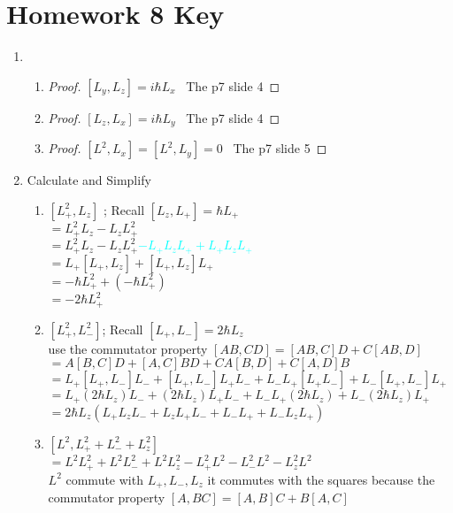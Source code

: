 \documentclass{article}
\begin{document}
\section*{Homework 8 Key}
 
\begin{enumerate}%
\item 
    \begin{enumerate}
    \item \begin{proof} $[L_y,L_z]=i\hbar L_x$
    \ The p7 slide 4
    \end{proof}
    \item \begin{proof} $[L_z,L_x]=i\hbar L_y$
    \ The p7 slide 4
    \end{proof}
    \item \begin{proof} $[L^2,L_x]=[L^2,L_y]=0$
    \ The p7 slide 5
    \end{proof}
    \end{enumerate}
\item Calculate and Simplify
    \begin{enumerate}
        \item $[L_+^2,L_z]$ ; Recall $[L_z,L_+]=\hbar L_+$
        \\ $= L_+^2L_z-L_zL_+^2$
        \\ $= L_+^2L_z-L_zL_+^2$\textcolor{cyan}{$-L_+L_zL_++L_+L_zL_+$}
        \\ $= L_+[L_+,L_z] + [L_+,L_z]L_+$
        \\ $= -\hbar L_+^2+(-\hbar L_+^2)$
        \\ $=-2\hbar L_+^2$
        \item $[L_+^2,L_-^2]$; Recall $[L_+,L_-]=2\hbar L_z$
        \\ use the commutator property $[AB,CD]=[AB,C]D+C[AB,D]$
        \\ $= A[B,C]D+[A,C]BD+CA[B,D]+C[A,D]B$
        \\ $=L_+[L_+,L_-]L_-+[L_+,L_-]L_+L_-+L_-L_+[L_+L_-]+L_-[L_+,L_-]L_+$
        \\ $=L_+(2\hbar L_z)L_-+(2\hbar L_z)L_+L_-+L_-L_+(2\hbar L_z)+L_-(2\hbar L_z)L_+$
        \\ $= 2\hbar L_z(L_+L_zL_-+L_zL_+L_-+L_-L_++L_-L_zL_+)$
        \item $[L^2,L_+^2+L_-^2+L_z^2]$
        \\ $= L^2L_+^2+L^2L_-^2+L^2L_z^2-L_+^2L^2-L_-^2L^2-L_z^2L^2$
        \\ $L^2$ commute with $L_+,L_-,L_z$ it commutes with the squares because the commutator property $[A,BC]=[A,B]C+B[A,C]$

\end{enumerate}
\end{enumerate}
\end{document}
